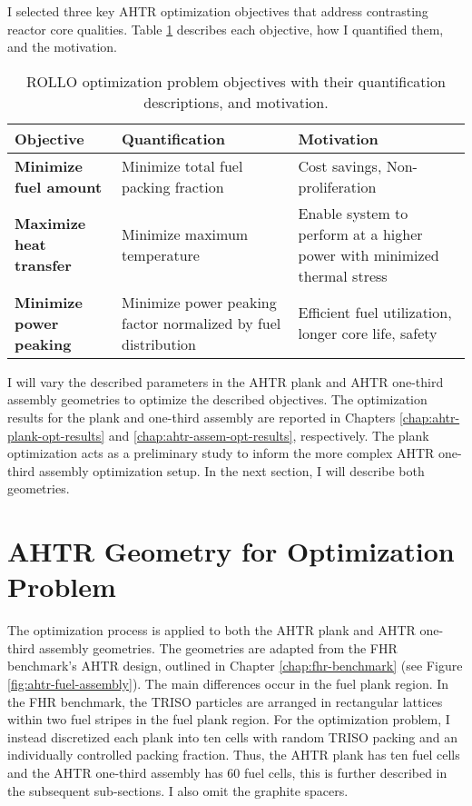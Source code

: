 I selected three key \gls{AHTR} optimization objectives that address contrasting reactor 
core qualities. 
Table \ref{tab:objectives} describes each objective, how I quantified them, and the motivation.
\begin{table}[htbp]
    \centering
    \onehalfspacing
    \caption{\acrfull{ROLLO} optimization problem objectives with their quantification 
    descriptions, and motivation.}
	\label{tab:objectives}
    \footnotesize
    \begin{tabular}{p{4.5cm}|p{5cm}p{5cm}}
    \hline 
    \textbf{Objective}& \textbf{Quantification}& \textbf{Motivation} \\
    \hline
    \textbf{Minimize fuel amount} & Minimize total fuel packing fraction & Cost savings, Non-proliferation \\ 
    \hline
    \textbf{Maximize heat transfer} & Minimize maximum temperature & Enable system to perform at a higher power with minimized thermal stress \\
    \hline
    \textbf{Minimize power peaking} & Minimize power peaking factor normalized by fuel distribution & Efficient fuel utilization, longer core life, safety\\
    \hline
    \end{tabular}
\end{table}
I will vary the described parameters in the \gls{AHTR} plank and \gls{AHTR} one-third assembly 
geometries to optimize the described objectives.
The optimization results for the plank and one-third assembly are reported in Chapters 
\ref{chap:ahtr-plank-opt-results} and \ref{chap:ahtr-assem-opt-results}, respectively. 
The plank optimization acts as a preliminary study to inform the more complex \gls{AHTR} one-third
assembly optimization setup. 
In the next section, I will describe both geometries. 

\section{AHTR Geometry for Optimization Problem}
The optimization process is applied to both the \gls{AHTR} plank and \gls{AHTR} one-third
assembly geometries.
The geometries are adapted from the \gls{FHR} benchmark's \gls{AHTR} design,
outlined in Chapter \ref{chap:fhr-benchmark} (see Figure \ref{fig:ahtr-fuel-assembly}).
The main differences occur in the fuel plank region. 
In the \gls{FHR} benchmark, the TRISO particles are arranged in rectangular lattices within
two fuel stripes in the fuel plank region. 
For the optimization problem, I instead discretized each plank into ten cells with random 
TRISO packing and an individually controlled packing fraction. 
Thus, the \gls{AHTR} plank has ten fuel cells and the \gls{AHTR}  one-third assembly has 
60 fuel cells, this is further described in the subsequent sub-sections.  
I also omit the graphite spacers. 

